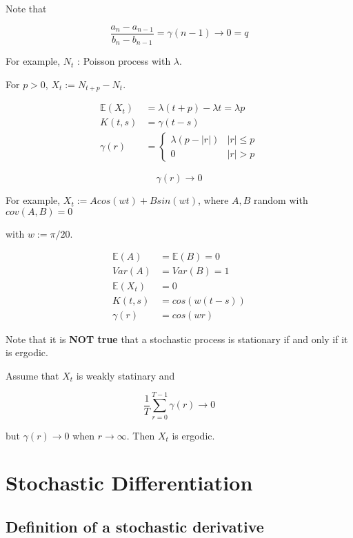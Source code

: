 \documentclass[12pt]{article}
\theoremstyle{nonumberbreak}
\begin{document}
Note that 

$$
\frac{a_n - a_{n-1}}{b_n - b_{n-1}}  = \gamma(n-1) \to 0 = q
$$


For example, $N_t$ : Poisson process with $\lambda$. 

For $p > 0$, $X_t := N_{t+p} - N_t$. 

$$
\begin{aligned}
\mathbb{E}(X_t) &= \lambda(t + p) - \lambda t = \lambda p \\[8pt]
K(t,s) &= \gamma(t-s) \\[8pt]
\gamma(r) &= \begin{cases} \lambda (p - |r| ) & |r| \le p \\ 0 & |r| > p \end{cases}
\end{aligned}
$$

$$
\gamma(r) \to 0
$$



For example, $X_t := A cos(wt) + B sin(wt)$, where $A,B$ random with $cov(A,B) = 0$

with $w := \pi /20$. 

$$
\begin{aligned}
\mathbb{E}(A) &= \mathbb{E}(B) =0 \\[8pt]
Var(A) &= Var(B) = 1 \\[10pt]
\mathbb{E}(X_t) &= 0 \\[8pt]
K(t,s) &= cos\left( w(t-s)  \right) \\[8pt]
\gamma(r) &= cos(wr)
\end{aligned}
$$


Note that it is \textbf{NOT true} that a stochastic process is stationary if and only if it is ergodic.


Assume that $X_t$ is weakly statinary and 

$$
\frac{1}{T} \sum_{r=0}^{T-1} \gamma(r) \to 0
$$

but $\gamma(r) \to 0$ when $r \to \infty$. Then $X_t$ is ergodic. 




\pagebreak
\section{Stochastic Differentiation}


\subsection{Definition of a stochastic derivative}
\end{document}
